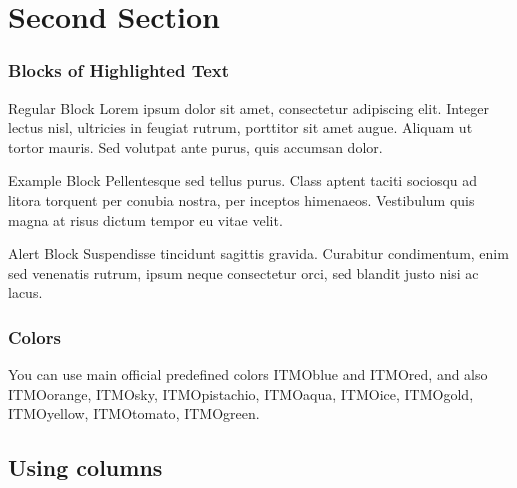\documentclass[aspectratio=169]{beamer}
\begin{document}
\section{Second Section} 

\begin{frame}
\frametitle{Blocks of Highlighted Text}
\begin{block}{Regular Block}
Lorem ipsum dolor sit amet, consectetur adipiscing elit. Integer lectus nisl, ultricies in feugiat rutrum, porttitor sit amet augue. Aliquam ut tortor mauris. Sed volutpat ante purus, quis accumsan dolor.
\end{block}

\begin{exampleblock}{Example Block}
Pellentesque sed tellus purus. Class aptent taciti sociosqu ad litora torquent per conubia nostra, per inceptos himenaeos. Vestibulum quis magna at risus dictum tempor eu vitae velit.
\end{exampleblock}

\begin{alertblock}{Alert Block}
Suspendisse tincidunt sagittis gravida. Curabitur condimentum, enim sed venenatis rutrum, ipsum neque consectetur orci, sed blandit justo nisi ac lacus.
\end{alertblock}
\end{frame}


\begin{frame}
\frametitle{Colors}

You can use main official predefined colors 
\textcolor{ITMOblue}{ITMOblue} and \textcolor{ITMOred}{ITMOred}, and also
 \textcolor{ITMOorange}{ITMOorange}, \textcolor{ITMOsky}{ITMOsky}, \textcolor{ITMOpistachio}{ITMOpistachio}, \textcolor{ITMOaqua}{ITMOaqua}, \textcolor{ITMOice}{ITMOice}, \textcolor{ITMOgold}{ITMOgold}, \textcolor{ITMOyellow}{ITMOyellow}, \textcolor{ITMOtomato}{ITMOtomato}, \textcolor{ITMOgreen}{ITMOgreen}.

\end{frame}



\subsection{Using columns}
\end{document}
